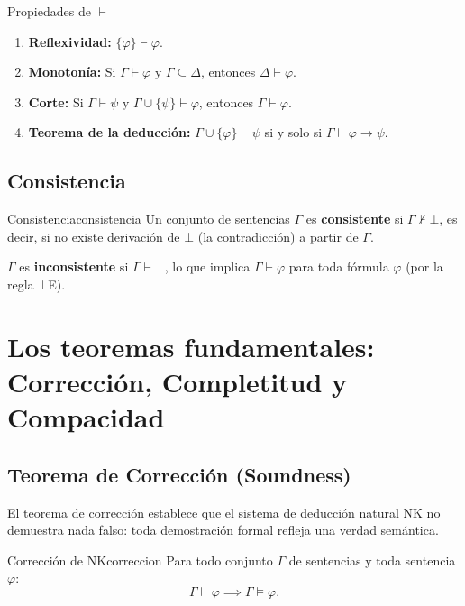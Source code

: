 \begin{proposicion}{Propiedades de $\vdash$}{}
\begin{enumerate}[leftmargin=2em, label=(\roman*)]
  \item \textbf{Reflexividad:} $\{\varphi\} \vdash \varphi$.
  \item \textbf{Monotonía:} Si $\Gamma \vdash \varphi$ y $\Gamma \subseteq \Delta$, entonces $\Delta \vdash \varphi$.
  \item \textbf{Corte:} Si $\Gamma \vdash \psi$ y $\Gamma \cup \{\psi\} \vdash \varphi$, entonces $\Gamma \vdash \varphi$.
  \item \textbf{Teorema de la deducción:} $\Gamma \cup \{\varphi\} \vdash \psi$ si y solo si $\Gamma \vdash \varphi \to \psi$.
\end{enumerate}
\end{proposicion}

\subsection{Consistencia}

\begin{definicion}{Consistencia}{consistencia}
Un conjunto de sentencias $\Gamma$ es \textbf{consistente} si $\Gamma \not\vdash \bot$, es decir, si no existe derivación de $\bot$ (la contradicción) a partir de $\Gamma$.

$\Gamma$ es \textbf{inconsistente} si $\Gamma \vdash \bot$, lo que implica $\Gamma \vdash \varphi$ para toda fórmula $\varphi$ (por la regla $\bot$E).
\end{definicion}

\section{Los teoremas fundamentales: Corrección, Completitud y Compacidad}

\subsection{Teorema de Corrección (Soundness)}

El teorema de corrección establece que el sistema de deducción natural NK no demuestra nada falso: toda demostración formal refleja una verdad semántica.

\begin{teorema}{Corrección de NK}{correccion}
Para todo conjunto $\Gamma$ de sentencias y toda sentencia $\varphi$:
\[
  \Gamma \vdash \varphi \implies \Gamma \models \varphi.
\]
\end{teorema}

